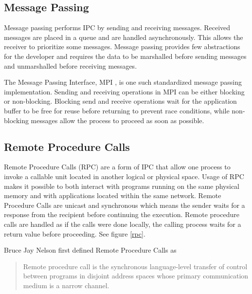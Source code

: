 \subsection{Message Passing}
Message passing performs IPC by sending and receiving messages. Received messages are placed in a queue and are handled asynchronously. This allows the receiver to prioritize some messages. Message passing provides few abstractions for the developer and requires the data to be marshalled before sending messages and unmarshalled before receiving messages.

The Message Passing Interface, MPI \cite{mpi3stand}, is one such standardized message passing implementation. Sending and receiving operations in MPI can be either blocking or non-blocking. Blocking send and receive operations wait for the application buffer to be free for reuse before returning to prevent race conditions, while non-blocking messages allow the process to proceed as soon as possible.

\subsection{Remote Procedure Calls}
Remote Procedure Calls (RPC) are a form of IPC that allow one process to invoke a callable unit \cite{Eac} located in another logical or physical space. Usage of RPC makes it possible to both interact with programs running on the same physical memory and with applications located within the same network.
Remote Procedure Calls are unicast and synchronous which means the sender waits for a response from the recipient before continuing the execution. Remote procedure calls are handled as if the calls were done locally, the calling process waits for a return value before proceeding. See figure \ref{rpc}.

Bruce Jay Nelson first defined Remote Procedure Calls as
\begin{quotation}
Remote procedure call is the synchronous language-level transfer of control between programs in disjoint address spaces whose primary communication medium is a narrow channel.  \cite{Nelson:1981:RPC:910306}
\end{quotation}

